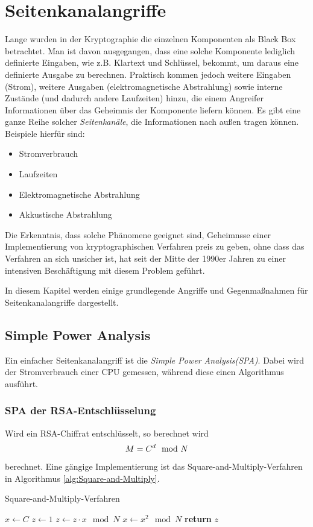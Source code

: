 \chapter{Seitenkanalangriffe}
\label{sec:seitenkanalangriffe}
Lange wurden in der Kryptographie die einzelnen Komponenten als Black
Box betrachtet. Man ist davon ausgegangen, dass eine solche Komponente
lediglich definierte Eingaben, wie z.B. Klartext und Schlüssel, bekommt,
um daraus eine definierte Ausgabe zu berechnen. Praktisch kommen jedoch
weitere Eingaben (Strom), weitere Ausgaben (elektromagnetische
Abstrahlung) sowie interne Zustände (und dadurch andere Laufzeiten)
hinzu, die einem Angreifer Informationen über das Geheimnis der
Komponente liefern können. Es gibt eine ganze Reihe solcher
\emph{Seitenkanäle}, die Informationen nach außen tragen
können. Beispiele hierfür sind:
\begin{itemize}
\item Stromverbrauch
\item Laufzeiten
\item Elektromagnetische Abstrahlung
\item Akkustische Abstrahlung
\end{itemize}

Die Erkenntnis, dass solche Phänomene geeignet sind, Geheimnsse einer
Implementierung von kryptographischen Verfahren preis zu geben, ohne
dass das Verfahren an sich unsicher ist, hat seit der Mitte der 1990er
Jahren zu einer intensiven Beschäftigung mit diesem Problem geführt. 

In diesem Kapitel werden einige grundlegende Angriffe und Gegenmaßnahmen
für Seitenkanalangriffe dargestellt.

\section{Simple Power Analysis}
\label{sec:simple-power-analys}
Ein einfacher Seitenkanalangriff ist die \emph{Simple Power
  Analysis(SPA)}. Dabei wird der Stromverbrauch einer CPU gemessen,
während diese einen Algorithmus ausführt. 
\subsection{SPA der RSA-Entschlüsselung}
Wird ein RSA-Chiffrat entschlüsselt, so berechnet wird \[M
  =C^d \mod N\] berechnet. Eine gängige Implementierung ist das
Square-and-Multiply-Verfahren in Algorithmus \ref{alg:Square-and-Multiply}. 
\begin{algorithm}[!h]
\caption{Square-and-Multiply-Verfahren}
\label{alg:Square-and-Multiply}
\begin{algorithmic}

  \State $x \gets C$
  \State $z \gets 1$
      \State $z \gets z \cdot x \mod N$
    \EndIf
    \State $x \gets x^2 \mod N$
  \EndFor
  \State \textbf{return} $z$
\EndProcedure
\end{algorithmic}
\end{algorithm}

